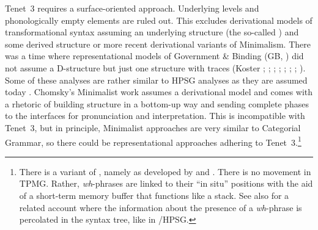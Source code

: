 \documentclass[output=paper
	        ,collection
	        ,collectionchapter
 	        ,biblatex
                ,babelshorthands
                ,newtxmath
                ,draftmode
                ,colorlinks, citecolor=brown
]{langscibook}
\begin{document}
Tenet~3 requires a surface-oriented approach. Underlying levels and phonologically empty elements
are ruled out. This excludes derivational models of transformational syntax assuming an underlying
structure (the so-called ) and some derived structure or more recent derivational variants of Minimalism. There was a time
where representational models of Government \& Binding (GB, \citealt{Chomsky81a}) did not assume a D-structure but just one structure with
traces (Koster \citeyear[\page ]{Koster78b-u}; \citeyear[]{Koster87a-u}; 
\citealp{KT91a}; \citealp[Section~1.4]{Haider93a}; 
\citealp[]{Frey93a}; \citealp[--88, 177--178]{Lohnstein93a-u}; \citealp[]{FC94a}; \citealp[]{Veenstra98a}). Some of these analyses are rather similar to HPSG
analyses as they are assumed today \citep{Kiss95a,BvN98a,Meurers2000b,Mueller2005c,MuellerGS,MuellerGermanic}. Chomsky's Minimalist work \citep{Chomsky95a-u} assumes a derivational model and comes
with a rhetoric of building structure in a bottom-up way and sending complete phases to the
interfaces for pronunciation and interpretation. This is incompatible with Tenet~3, but in principle,
Minimalist approaches are very similar to Categorial Grammar, so there could be representational
approaches adhering to Tenet~3.\footnote{%
  There is a variant of  \citep{Stabler2010b}, namely  as developed by \citet{Chesi2004a-u,Chesi2007a-u} and \citet{BC2006a-u,BC2012a-u}. There is
  no movement in TPMG. Rather, \emph{wh}-phrases are linked to their ``in situ'' positions with the
aid of a short-term memory  buffer that functions like a stack. See
also \citet{Hunter2010a-u,Hunter2018a-u} for a related account where the
information about the presence of a \emph{wh}-phrase is percolated in the
syntax tree, like in /HPSG. 
}
\end{document}
